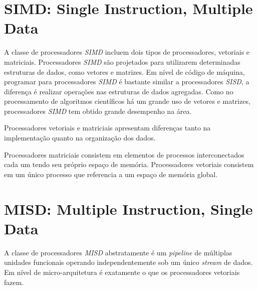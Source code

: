 \section{SIMD: Single Instruction, Multiple Data}

A classe de processadores \textit{SIMD} incluem dois tipos de
processadores, vetoriais e matriciais.
Processadores \textit{SIMD} são projetados para utilizarem determinadas
estruturas de dados, como vetores e matrizes. 
Em nível de código de máquina, programar para processadores \textit{SIMD} é 
bastante similar a processadores \textit{SISD}, a diferença é realizar operações
nas estruturas de dados agregadas. Como no processamento de algoritmos 
científicos há um grande uso de vetores e matrizes, processadores \textit{SIMD}
tem obtido grande desempenho na área.

Processadores vetoriais e matriciais apresentam diferenças tanto na 
implementação quanto na organização dos dados.

Processadores matriciais consistem em elementos de processos interconectados
cada um tendo seu próprio espaço de memória. Processadores vetoriais consistem
em um único processo que referencia a um espaço de memória global.





\section{MISD: Multiple Instruction, Single Data}

A classe de processadores \textit{MISD} abstratamente é um
\textit{pipeline} de múltiplas unidades funcionais operando independentemente
sob um único \textit{stream} de dados. Em nível de micro-arquitetura é
exatamente o que os processadores vetoriais fazem.

